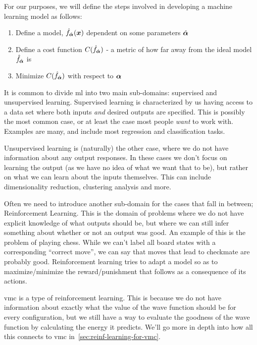 \documentclass[Thesis.tex]{subfiles}
\begin{document}
For our purposes, we will define the steps involved in developing a machine
learning model as follows:

\begin{enumerate}
  \item Define a model, $\hat f_{\hat{\bm{\alpha}}}(\bm{x})$ dependent on some parameters $\hat{\bm{\alpha}}$
  \item Define a cost function $C(\hat f_{\hat{\bm{\alpha}}})$ - a metric of how far away from the
      ideal model $\hat f_{\hat{\bm{\alpha}}}$ is
  \item Minimize $C(\hat f_{\hat{\bm{\alpha}}})$ with respect to $\bm{\alpha}$
\end{enumerate}

It is common to divide \gls{ml} into two main sub-domains: supervised and unsupervised
learning. Supervised learning is characterized by us having access to a data set
where both inputs \emph{and} desired outputs are specified. This is possibly the
most common case, or at least the case most people \emph{want} to work with.
Examples are many, and include most regression and classification tasks.

Unsupervised learning is (naturally) the other case, where we do not have
information about any output responses. In these cases we don't focus on
learning the output (as we have no idea of what we want that to be), but rather
on what we can learn about the inputs themselves. This can include
dimensionality reduction, clustering analysis and more.

Often we need to introduce another sub-domain for the cases that fall in
between; Reinforcement Learning. This is the domain of problems where we do not
have explicit knowledge of what outputs should be, but where we can still infer
something about whether or not an output was good. An example of this is the
problem of playing chess. While we can't label all board states with a
corresponding ``correct move'', we can say that moves that lead to
checkmate are probably good. Reinforcement learning tries to adapt a model so as
to maximize/minimize the reward/punishment that follows as a consequence of its
actions.

\gls{vmc} is a type of reinforcement learning. This is because we
do not have information about exactly what the value of the wave function should
be for every configuration, but we still have a way to evaluate the goodness
of the wave function by calculating the energy it predicts. We'll go more in
depth into how all this connects to \gls{vmc} in~\cref{sec:reinf-learning-for-vmc}.
\end{document}
